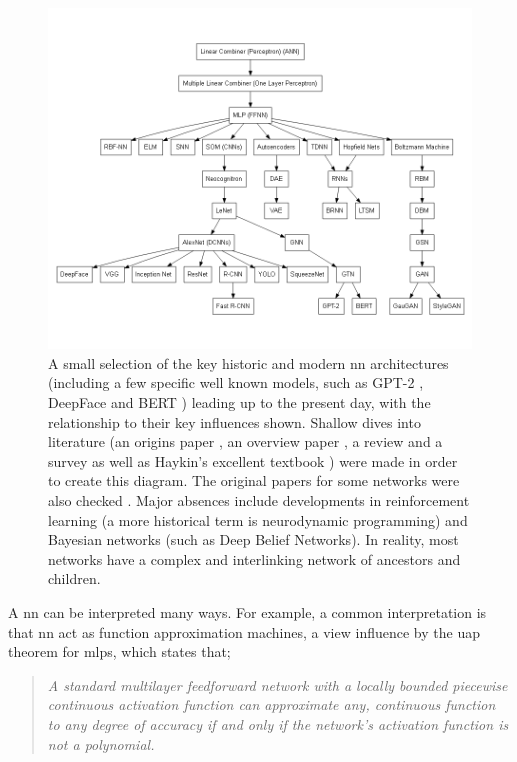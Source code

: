 \begin{figure}[h]
    \centering
    \includegraphics[width=140mm,scale=1.5]{figs/nn_architectures.png}
    \caption[Neural network architectures.]{A small selection of the key historic and modern \gls{nn} architectures (including a few specific well known models, such as GPT-2 \cite{gpt2}, DeepFace \cite{deep_face} and BERT \cite{bert}) leading up to the present day, with the relationship to their key influences shown. Shallow dives into literature (an origins paper \cite{dl_origin}, an overview paper \cite{dl_overview}, a review \cite{gnn_review} and a survey \cite{elm_survey} as well as Haykin's excellent textbook \cite{haykin}) were made in order to create this diagram. The original papers for some networks were also checked \cite{gaugan} \cite{bdnn} \cite{ltsm} \cite{bdnn} \cite{backprop_rumelhart}  \cite{gpt2} \cite{hopfieldnetworks} \cite{yolo}. Major absences include developments in reinforcement learning (a more historical term is neurodynamic programming) and Bayesian networks (such as Deep Belief Networks). In reality, most networks have a complex and interlinking network of ancestors and children.}
    \label{fig:nn_architectures}
\end{figure}

A \gls{nn} can be interpreted many ways. For example, a common interpretation is that \gls{nn} act as function approximation machines, a view influence by the \gls{uap} theorem for \gls{mlp}s, which states that;

\begin{quote}
    \textit{A standard multilayer feedforward network with a locally bounded piecewise continuous activation function can approximate any, continuous function to any degree of accuracy if and only if the network's activation function is not a polynomial.\cite{uap_mlp}}
\end{quote}

